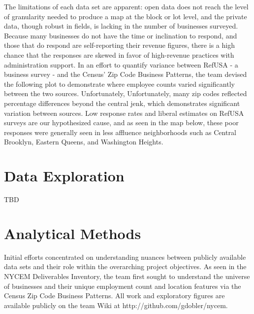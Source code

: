 \documentclass[article, 11pt]{article} %
\begin{document}
The limitations of each data set are apparent: open data does not reach the level of granularity needed to produce a map at the block or lot level, and the private data, though robust in fields, is lacking in the number of businesses surveyed. Because many businesses do not have the time or inclination to respond, and those that do respond are self-reporting their revenue figures, there is a high chance that the responses are skewed in favor of high-revenue practices with administration support. In an effort to quantify variance between RefUSA - a business survey - and the Census' Zip Code Business Patterns, the team devised the following plot to demonstrate where employee counts varied significantly between the two sources. Unfortunately, Unfortunately, many zip codes reflected percentage differences beyond the central jenk, which demonstrates significant variation between sources. Low response rates and liberal estimates on RefUSA surveys are our hypothesized cause, and as seen in the map below, these poor responses were generally seen in less affluence neighborhoods such as Central Brooklyn, Eastern Queens, and Washington Heights.


\section*{Data Exploration}

TBD



\section*{Analytical Methods}

Initial efforts concentrated on understanding nuances between publicly available data sets and their role within the overarching project objectives. As seen in the NYCEM Deliverables Inventory, the team first sought to understand the universe of businesses and their unique employment count and location features via the Census Zip Code Business Patterns. All work and exploratory figures are available publicly on the team Wiki at http://github.com/gdobler/nycem.
\end{document}
